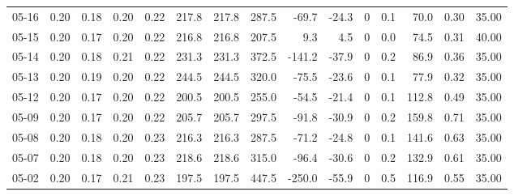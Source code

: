 \begin{threeparttable}
{\begin{tabular}{lrrrrrrrrrrrrrr}
  05-16 &          0.20 &          0.18 &          0.20 &        0.22 &               217.8 &              217.8 &               287.5 &      -69.7 &        -24.3 &              0 &                 0.1 &             70.0 &            0.30 &                  35.00 \\
  05-15 &          0.20 &          0.17 &          0.20 &        0.22 &               216.8 &              216.8 &               207.5 &        9.3 &          4.5 &              0 &                 0.0 &             74.5 &            0.31 &                  40.00 \\
  05-14 &          0.20 &          0.18 &          0.21 &        0.22 &               231.3 &              231.3 &               372.5 &     -141.2 &        -37.9 &              0 &                 0.2 &             86.9 &            0.36 &                  35.00 \\
  05-13 &          0.20 &          0.19 &          0.20 &        0.22 &               244.5 &              244.5 &               320.0 &      -75.5 &        -23.6 &              0 &                 0.1 &             77.9 &            0.32 &                  35.00 \\
  05-12 &          0.20 &          0.17 &          0.20 &        0.22 &               200.5 &              200.5 &               255.0 &      -54.5 &        -21.4 &              0 &                 0.1 &            112.8 &            0.49 &                  35.00 \\
  05-09 &          0.20 &          0.17 &          0.20 &        0.22 &               205.7 &              205.7 &               297.5 &      -91.8 &        -30.9 &              0 &                 0.2 &            159.8 &            0.71 &                  35.00 \\
  05-08 &          0.20 &          0.18 &          0.20 &        0.23 &               216.3 &              216.3 &               287.5 &      -71.2 &        -24.8 &              0 &                 0.1 &            141.6 &            0.63 &                  35.00 \\
  05-07 &          0.20 &          0.18 &          0.20 &        0.23 &               218.6 &              218.6 &               315.0 &      -96.4 &        -30.6 &              0 &                 0.2 &            132.9 &            0.61 &                  35.00 \\
  05-02 &          0.20 &          0.17 &          0.21 &        0.23 &               197.5 &              197.5 &               447.5 &     -250.0 &        -55.9 &              0 &                 0.5 &            116.9 &            0.55 &                  35.00 \\

\end{tabular}}
\end{threeparttable}
